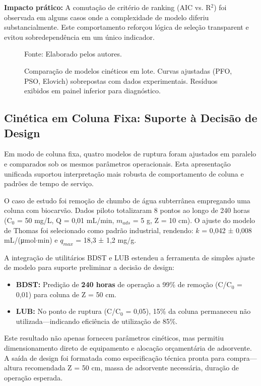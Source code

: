 \documentclass[openany, a4paper, twoside]{article}
\begin{document}
\noindent \textbf{Impacto prático:} A comutação de critério de ranking (AIC vs. R$^2$) foi observada em alguns casos onde a complexidade de modelo diferiu substancialmente. Este comportamento reforçou lógica de seleção transparent e evitou sobredependência em um único indicador.

\begin{figure}[h!]
	\centering
	\caption{Comparação de modelos cinéticos em lote. Curvas ajustadas (PFO, PSO, Elovich) sobrepostas com dados experimentais. Resíduos exibidos em painel inferior para diagnóstico.}
	Fonte: Elaborado pelos autores.
	\label{fig:batch_kinetics}
\end{figure}

\subsection{Cinética em Coluna Fixa: Suporte à Decisão de Design}

Em modo de coluna fixa, quatro modelos de ruptura foram ajustados em paralelo e comparados sob os mesmos parâmetros operacionais. Esta apresentação unificada suportou interpretação mais robusta de comportamento de coluna e padrões de tempo de serviço.

O caso de estudo foi remoção de chumbo de água subterrânea empregando uma coluna com biocarvão. Dados piloto totalizaram 8 pontos ao longo de 240 horas (C$_0$ = 50 mg/L, Q = 0,01 mL/min, $m_{ads}$ = 5 g, Z = 10 cm). O ajuste do modelo de Thomas foi selecionado como padrão industrial, rendendo: $k$ = 0,042 ± 0,008 mL/(μmol$\cdot$min) e $q_{max}$ = 18,3 ± 1,2 mg/g.

A integração de utilitários BDST e LUB estendeu a ferramenta de simples ajuste de modelo para suporte preliminar a decisão de design:

\begin{itemize}
	\item \textbf{BDST:} Predição de \textbf{240 horas} de operação a 99\% de remoção (C/C$_0$ = 0,01) para coluna de Z = 50 cm.
	\item \textbf{LUB:} No ponto de ruptura (C/C$_0$ = 0,05), 15\% da coluna permaneceu não utilizada—indicando eficiência de utilização de 85\%.
\end{itemize}

Este resultado não apenas forneceu parâmetros cinéticos, mas permitiu dimensionamento direto de equipamento e alocação orçamentária de adsorvente. A saída de design foi formatada como especificação técnica pronta para compra---altura recomendada Z = 50 cm, massa de adsorvente necessária, duração de operação esperada.
\end{document}
